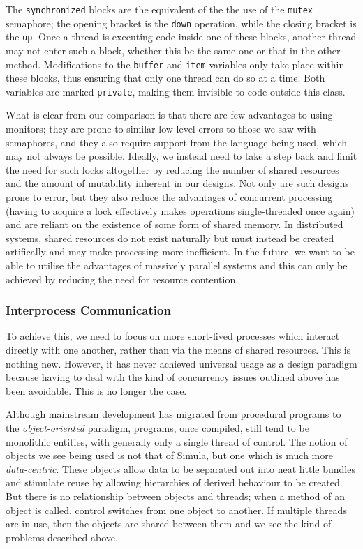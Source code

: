 The \texttt{synchronized} blocks are the equivalent of the the use of
the \texttt{mutex} semaphore; the opening bracket is the \texttt{down}
operation, while the closing bracket is the \texttt{up}.  Once a
thread is executing code inside one of these blocks, another thread
may not enter such a block, whether this be the same one or that in
the other method.  Modifications to the \texttt{buffer} and
\texttt{item} variables only take place within these blocks, thus
ensuring that only one thread can do so at a time.  Both variables are
marked \texttt{private}, making them invisible to code outside this
class.

What is clear from our comparison is that there are few advantages to
using monitors; they are prone to similar low level errors to those we
saw with semaphores, and they also require support from the language
being used, which may not always be possible.  Ideally, we instead
need to take a step back and limit the need for such locks altogether
by reducing the number of shared resources and the amount of
mutability inherent in our designs.  Not only are such designs prone
to error, but they also reduce the advantages of concurrent processing
(having to acquire a lock effectively makes operations single-threaded
once again) and are reliant on the existence of some form of shared
memory.  In distributed systems, shared resources do not exist
naturally but must instead be created artifically and may make
processing more inefficient.  In the future, we want to be able to
utilise the advantages of massively parallel systems and this can only
be achieved by reducing the need for resource contention.

\subsubsection{Interprocess Communication}

To achieve this, we need to focus on more short-lived processes which
interact directly with one another, rather than via the means of
shared resources.  This is nothing new.  However, it has never
achieved universal usage as a design paradigm because having to deal
with the kind of concurrency issues outlined above has been avoidable.
This is no longer the case.

Although mainstream development has migrated from procedural programs
to the \emph{object-oriented} paradigm, programs, once compiled, still
tend to be monolithic entities, with generally only a single thread of
control.  The notion of objects we see being used is not that of
Simula\cite{simula}, but one which is much more \emph{data-centric}.
These objects allow data to be separated out into neat little bundles
and stimulate reuse by allowing hierarchies of derived behaviour to be
created.  But there is no relationship between objects and threads;
when a method of an object is called, control switches from one object
to another.  If multiple threads are in use, then the objects are
shared between them and we see the kind of problems described above.

